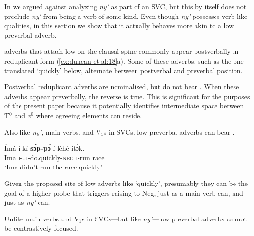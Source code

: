 \documentclass[output=paper,modfonts,nonflat,
colorlinks, citecolor=brown,
draftmode
]{langsci/langscibook}
\begin{document}
In  we argued against analyzing \textit{ny\'{\textturnv}\ng} as part of an SVC, but this by itself does not preclude \textit{ny\'{\textturnv}\ng} from being a verb of some kind. Even though \textit{ny\'{\textturnv}\ng} possesses verb-like qualities, in this section we show that it actually behaves more akin to a low preverbal adverb.

 adverbs that attach low on the clausal spine commonly appear postverbally in reduplicant form (\ref{ex:duncan-et-al:18}a). Some of these adverbs, such as the one translated `quickly' below, alternate between postverbal and preverbal position.

\ea\label{ex:duncan-et-al:18}
\z
\z

\noindent Postverbal reduplicant adverbs are nominalized, but do not bear . When these adverbs appear preverbally, the reverse is true. This is significant for the purposes of the present paper because it potentially identifies intermediate space between T$^0$ and \textit{v}$^0$ where  agreeing elements can reside.

Also like \textit{ny\'{\textturnv}\ng}, main verbs, and V$_1$s in SVCs, low preverbal adverbs can bear .

\ea\label{ex:duncan-et-al:19}
\gll \'{I}má í-kí-\textbf{s\'ɔp-p\'ɔ} í-f\`{e}hé ít\`ɔk. \\
Ima \textsc{i}-{\PST.\FOC}.\textsc{i}-do.quickly-\textsc{neg} \textsc{i}-run race \\
\glt `Ima didn't run the race quickly.'
\z

\noindent Given the proposed site of low adverbs like `quickly', presumably they can be the goal of a higher probe that triggers raising-to-Neg, just as a main verb can, and just as \textit{ny\'{\textturnv}\ng} can. 

Unlike main verbs and V$_1$s in SVCs---but like \textit{ny\'{\textturnv}\ng}---low preverbal adverbs cannot be contrastively focused.
\end{document}
